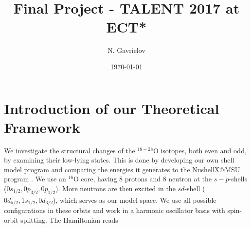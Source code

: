 \documentclass[aps,prl,reprint,groupedaddress]{revtex4-1}  %
\begin{document}
\title{Final Project - TALENT 2017 at ECT*}


\author{N. Gavrielov}
\affiliation{}


\date{\today}

\begin{abstract}
\end{abstract}

\pacs{}

\maketitle


\section{Introduction of our Theoretical Framework}

We investigate the structural changes of the $^{18-28}$O isotopes, both even and odd, by examining their low-lying states. This is done by developing our own shell model program and comparing the energies it generates to the NushellX@MSU program \cite{Brown2014}. 
We use an $^{16}$O core, having 8 protons and 8 neutron at the $s-p$-shells ($0s_{1/2},0p_{3/2},0p_{1/2}$). 
More neutrons are then excited in the $sd$-shell ($0d_{5/2},1s_{1/2},0d_{3/2}$), which serves as our model space. We use all possible configurations in these orbits and work in a harmonic oscillator basis with spin-orbit splitting. 
The Hamiltonian reads
\end{document}
